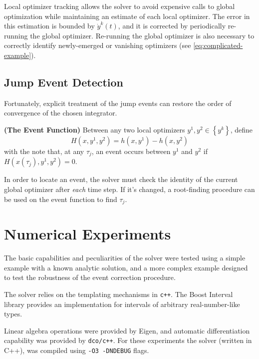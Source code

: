 \documentclass[twoside,leqno, twocolumn]{article}
\begin{document}
Local optimizer tracking allows the solver to avoid expensive calls to global optimization while maintaining an estimate of each local optimizer. The error in this estimation is bounded by $\dot y^k(t)$, and it is corrected by periodically re-running the global optimizer. Re-running the global optimizer is also necessary to correctly identify newly-emerged or vanishing optimizers (see \eqref{eq:complicated-example}).  

\subsection{Jump Event Detection}

Fortunately, explicit treatment of the jump events can restore the order of convergence of the chosen integrator.
\begin{Definition}
	\label{def:event-fn}
	\textbf{(The Event Function)}
	Between any two local optimizers $y^1, y^2 \in \left\{y^k\right\}$, define
	\begin{equation*}
		H(x, y^1, y^2) = h(x, y^1) - h(x, y^2)
	\end{equation*}
	with the note that, at any $\tau_j$, an event occurs between $y^1$ and $y^2$ if $H\left(x(\tau_j), y^1, y^2\right) = 0$.
\end{Definition}
In order to locate an event, the solver must check the identity of the current global optimizer after \textit{each} time step. If it's changed, a root-finding procedure can be used on the event function to find $\tau_j$.


\section{Numerical Experiments}
\label{section:numerical-experiments}
The basic capabilities and peculiarities of the solver were tested using a simple example with a known analytic solution, and a more complex example designed to test the robustness of the event correction procedure. 

The solver relies on the templating mechanisms in \texttt{c++}. The Boost Interval library \cite{melquiondBoostIntervalLibrary2022} provides an implementation for intervals of arbitrary real-number-like types.

Linear algebra operations were provided by Eigen\cite{guennebaudEigenV32010}, and automatic differentiation capability was provided by \texttt{dco/c++}\cite{leppkesDerivativeCodeOverloading2016}. For these experiments the solver (written in C++), was compiled using \texttt{-O3 -DNDEBUG} flags.
\end{document}
